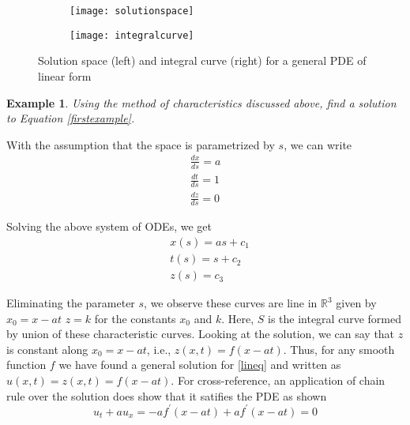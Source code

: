 \documentclass[11pt, a4paper]{report}
\newtheorem{example}{Example}[chapter] %
\begin{document}
\begin{center}
    \begin{figure}[h]
         \begin{subfigure}{0.5\textwidth}
            \texttt{[image: solutionspace]} 
        \end{subfigure}
        \begin{subfigure}{0.5\textwidth}
            \texttt{[image: integralcurve]}
        \end{subfigure}
         
        \caption{Solution space (left) and integral curve (right) for a general PDE of linear form}
        \label{fig:linearpdesolution}
    \end{figure}
\end{center}



\begin{example}
    \normalfont Using the method of characteristics discussed above, find a solution to Equation \eqref{firstexample}. 
\end{example}

With the assumption that the space is parametrized by $s$, we can write
\begin{equation} \label{sampleCharODEs}
    \begin{split}
        \frac{dx}{ds} = a\\
        \frac{dt}{ds} = 1\\
        \frac{dz}{ds} = 0
    \end{split}
\end{equation}

Solving the above system of ODEs, we get
\begin{equation*}
    \begin{aligned} %
        & x(s) = as + c_{1}\\[-0.5em] %
        & t(s) = s + c_{2}\\[-0.5em]
        & z(s) = c_{3}
    \end{aligned}
\end{equation*}

Eliminating the parameter $s$, we observe these curves are line in $\mathbb{R}^{3}$ given by $x_{0} = x - at$
$z = k$ for the constants $x_0$ and $k$. Here, $S$ is the integral curve formed by union of these characteristic
curves. Looking at the solution, we can say that $z$ is constant along $x_0 = x - at$, i.e., $z(x, t) = f(x-at)$. 
Thus, for any smooth function $f$ we have found a general solution for \eqref{lineq} and written as $u(x,t) = 
z(x,t) = f(x - at)$. For cross-reference, an application of chain rule over the solution does show that it satifies
the PDE as shown
\begin{equation*}
    u_{t} + au_{x} = -af^{\prime}(x - at) + af^{\prime}(x - at) = 0
\end{equation*}
\end{document}
